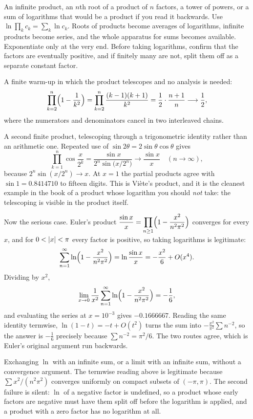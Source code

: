 \cue An infinite product, an $n$th root of a product of $n$ factors, a tower of powers, or a sum of logarithms that would be a product if you read it backwards.
\method Use $\ln\prod_{k}c_{k}=\sum_{k}\ln c_{k}$. Roots of products become averages of logarithms, infinite products become series, and the whole apparatus for sums becomes available. Exponentiate only at the very end. Before taking logarithms, confirm that the factors are eventually positive, and if finitely many are not, split them off as a separate constant factor.

\begin{worked}
A finite warm-up in which the product telescopes and no analysis is needed:
\[\prod_{k=2}^{n}\Bigl(1-\frac{1}{k^{2}}\Bigr)=\prod_{k=2}^{n}\frac{(k-1)(k+1)}{k^{2}}=\frac{1}{2}\cdot\frac{n+1}{n}\longrightarrow\frac12 ,\]
where the numerators and denominators cancel in two interleaved chains.

A second finite product, telescoping through a trigonometric identity rather than an arithmetic one. Repeated use of $\sin2\theta=2\sin\theta\cos\theta$ gives
\[\prod_{k=1}^{n}\cos\frac{x}{2^{k}}=\frac{\sin x}{2^{n}\sin\bigl(x/2^{n}\bigr)}\longrightarrow\frac{\sin x}{x}\quad(n\to\infty),\]
because $2^{n}\sin(x/2^{n})\to x$. At $x=1$ the partial products agree with $\sin1=0.8414710$ to fifteen digits. This is Vi\`ete's product, and it is the cleanest example in the book of a product whose logarithm you should \emph{not} take: the telescoping is visible in the product itself.

Now the serious case. Euler's product $\dfrac{\sin x}{x}=\displaystyle\prod_{n\geq1}\Bigl(1-\dfrac{x^{2}}{n^{2}\pi^{2}}\Bigr)$ converges for every $x$, and for $0<\left\lvert x\right\rvert<\pi$ every factor is positive, so taking logarithms is legitimate:
\[\sum_{n=1}^{\infty}\ln\Bigl(1-\frac{x^{2}}{n^{2}\pi^{2}}\Bigr)=\ln\frac{\sin x}{x}=-\frac{x^{2}}{6}+O(x^{4}).\]
Dividing by $x^{2}$,
\[\lim_{x\to0}\frac{1}{x^{2}}\sum_{n=1}^{\infty}\ln\Bigl(1-\frac{x^{2}}{n^{2}\pi^{2}}\Bigr)=-\frac16 ,\]
and evaluating the series at $x=10^{-3}$ gives $-0.1666667$. Reading the same identity termwise, $\ln(1-t)=-t+O(t^{2})$ turns the sum into $-\tfrac{x^{2}}{\pi^{2}}\sum n^{-2}$, so the answer is $-\tfrac16$ precisely because $\sum n^{-2}=\pi^{2}/6$. The two routes agree, which is Euler's original argument run backwards.
\end{worked}

\begin{trap}
Exchanging $\ln$ with an infinite sum, or a limit with an infinite sum, without a convergence argument. The termwise reading above is legitimate because $\sum x^{2}/(n^{2}\pi^{2})$ converges uniformly on compact subsets of $(-\pi,\pi)$. The second failure is silent: $\ln$ of a negative factor is undefined, so a product whose early factors are negative must have them split off before the logarithm is applied, and a product with a zero factor has no logarithm at all.
\end{trap}

